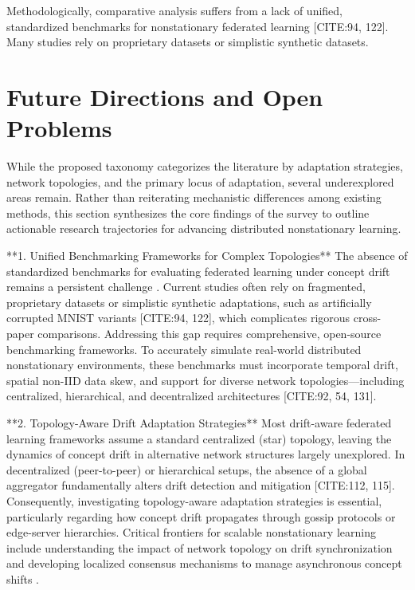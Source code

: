 \documentclass[journal]{IEEEtran}
\begin{document}
Methodologically, comparative analysis suffers from a lack of unified, standardized benchmarks for nonstationary federated learning [CITE:94, 122]. Many studies rely on proprietary datasets or simplistic synthetic datasets.

\section{Future Directions and Open Problems}
\label{sec:future_directions}

While the proposed taxonomy categorizes the literature by adaptation strategies, network topologies, and the primary locus of adaptation, several underexplored areas remain. Rather than reiterating mechanistic differences among existing methods, this section synthesizes the core findings of the survey to outline actionable research trajectories for advancing distributed nonstationary learning.

**1. Unified Benchmarking Frameworks for Complex Topologies**
The absence of standardized benchmarks for evaluating federated learning under concept drift remains a persistent challenge \cite{Mahdi2025}. Current studies often rely on fragmented, proprietary datasets or simplistic synthetic adaptations, such as artificially corrupted MNIST variants [CITE:94, 122], which complicates rigorous cross-paper comparisons. Addressing this gap requires comprehensive, open-source benchmarking frameworks. To accurately simulate real-world distributed nonstationary environments, these benchmarks must incorporate temporal drift, spatial non-IID data skew, and support for diverse network topologies—including centralized, hierarchical, and decentralized architectures [CITE:92, 54, 131].

**2. Topology-Aware Drift Adaptation Strategies**
Most drift-aware federated learning frameworks assume a standard centralized (star) topology, leaving the dynamics of concept drift in alternative network structures largely unexplored. In decentralized (peer-to-peer) or hierarchical setups, the absence of a global aggregator fundamentally alters drift detection and mitigation [CITE:112, 115]. Consequently, investigating topology-aware adaptation strategies is essential, particularly regarding how concept drift propagates through gossip protocols or edge-server hierarchies. Critical frontiers for scalable nonstationary learning include understanding the impact of network topology on drift synchronization and developing localized consensus mechanisms to manage asynchronous concept shifts \cite{Benameur2025}.
\end{document}
